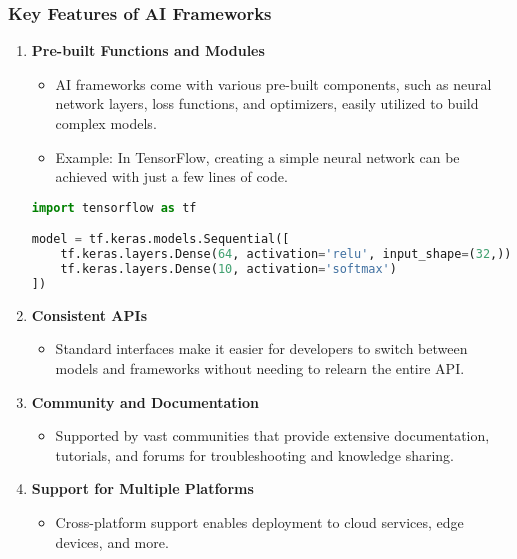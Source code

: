 \documentclass{beamer}
\begin{document}
\begin{frame}[fragile]
    \frametitle{Key Features of AI Frameworks}
    \begin{enumerate}
        \item \textbf{Pre-built Functions and Modules}
        \begin{itemize}
            \item AI frameworks come with various pre-built components, such as neural network layers, loss functions, and optimizers, easily utilized to build complex models.
            \item Example: In TensorFlow, creating a simple neural network can be achieved with just a few lines of code.
        \end{itemize}
        
        \begin{lstlisting}[language=Python]
import tensorflow as tf

model = tf.keras.models.Sequential([
    tf.keras.layers.Dense(64, activation='relu', input_shape=(32,)),
    tf.keras.layers.Dense(10, activation='softmax')
])
        \end{lstlisting}
        
        \item \textbf{Consistent APIs}
        \begin{itemize}
            \item Standard interfaces make it easier for developers to switch between models and frameworks without needing to relearn the entire API.
        \end{itemize}
        
        \item \textbf{Community and Documentation}
        \begin{itemize}
            \item Supported by vast communities that provide extensive documentation, tutorials, and forums for troubleshooting and knowledge sharing.
        \end{itemize}
        
        \item \textbf{Support for Multiple Platforms}
        \begin{itemize}
            \item Cross-platform support enables deployment to cloud services, edge devices, and more.
        \end{itemize}
    \end{enumerate}
\end{frame}
\end{document}
